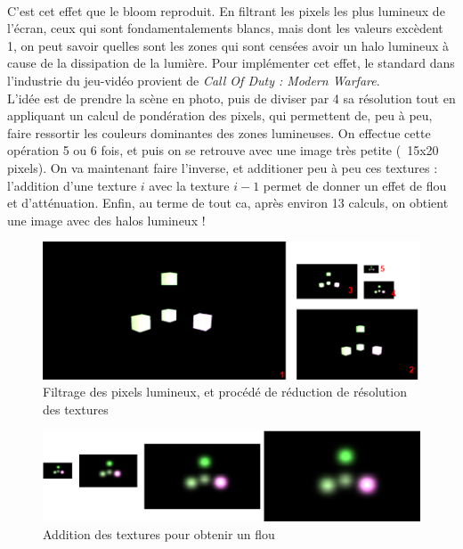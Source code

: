 \documentclass{EPUProjetDi}
\begin{document}
\paragraph{}
C'est cet effet que le bloom reproduit. En filtrant les pixels les plus lumineux de l'écran, ceux qui sont fondamentalements blancs, mais dont les valeurs excèdent 1, on peut savoir quelles sont les zones qui sont censées avoir un halo lumineux à cause de la dissipation de la lumière.
Pour implémenter cet effet, le standard dans l'industrie du jeu-vidéo provient de \textit{Call Of Duty : Modern Warfare}\cite{bloom}.\\
L'idée est de prendre la scène en photo, puis de diviser par 4 sa résolution tout en appliquant un calcul de pondération des pixels, qui permettent de, peu à peu, faire ressortir les couleurs dominantes des zones lumineuses.
On effectue cette opération 5 ou 6 fois, et puis on se retrouve avec une image très petite (~15x20 pixels). On va maintenant faire l'inverse, et additioner peu à peu ces textures : l'addition d'une texture $i$ avec la texture $i-1$ permet de donner un effet de flou et d'atténuation.
Enfin, au terme de tout ca, après environ 13 calculs, on obtient une image avec des halos lumineux !

\begin{figure}[ht]
	\centering
	\includegraphics[scale=.5]{down_samples}
	\caption{Filtrage des pixels lumineux, et procédé de réduction de résolution des textures}
	\label{fig:bloom_down_sample}
\end{figure}

\begin{figure}[ht]
	\centering
	\includegraphics[scale=.7]{up_samples}
	\caption{Addition des textures pour obtenir un flou}
	\label{fig:bloom_up_sample}
\end{figure}
\end{document}
